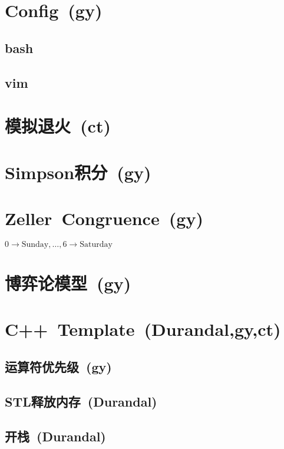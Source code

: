 \section{Config~\small(gy)}
    \subsection*{bash}
    \subsection*{vim}

\section{模拟退火~\small(ct)}

\section{Simpson积分~\small(gy)}

\section{Zeller~Congruence~\small(gy)}
    $ 0 \to \text{Sunday} , \dots , 6 \to \text{Saturday} $

\section{博弈论模型~\small(gy)}
    

\section{C++~Template~\small(Durandal,gy,ct)}
    \subsection*{运算符优先级~\small(gy)}
        
    \subsection*{STL释放内存~\small(Durandal)}
    \subsection*{开栈~\small(Durandal)}
